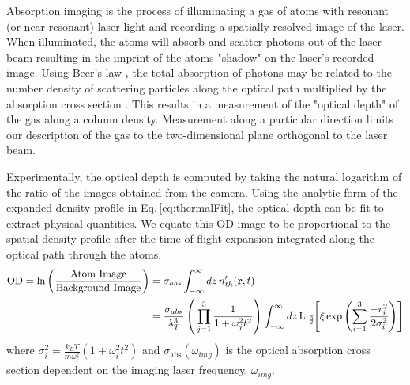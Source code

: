 Absorption imaging is the process of illuminating a gas of atoms with resonant (or near resonant) laser light and recording a spatially resolved image of the laser.
When illuminated, the atoms will absorb and scatter photons out of the laser beam resulting in the imprint of the atoms "shadow" on the laser's recorded image.
Using Beer's law \cite{Foot2005, Hueck2017, Reinaudi2007}, the total absorption of photons may be related to the number density of scattering particles along the optical path multiplied by the absorption cross section \cite{Mickelson2010b}. 
This results in a measurement of the "optical depth" of the gas along a column density. 
Measurement along a particular direction limits our description of the gas to the two-dimensional plane orthogonal to the laser beam.

Experimentally, the optical depth is computed by taking the natural logarithm of the ratio of the images obtained from the camera.
Using the analytic form of the expanded density profile in Eq.\,\ref{eq:thermalFit}, the optical depth can be fit to extract physical quantities.
We equate this OD image to be proportional to the spatial density profile after the time-of-flight expansion integrated along the optical path through the atoms.
\begin{equation} \label{eq:polyLogExp}
\begin{split}
	\text{OD} = \text{ln} \left( \frac{\text{Atom Image}}{\text{Background Image}} \right) &= \sigma_{abs} \int_{-\infty}^{\infty} dz \, n_{th}'(\mathbf{r},t) \\ 
&= \frac{\sigma_{abs}}{\lambda_T^3} \left( \, \prod_{j=1}^3 \frac{1}{1+\omega_j^2t^2}\right) \int_{-\infty}^{\infty} dz\,\text{Li}_{\scriptscriptstyle\frac{3}{2}\!}\!\left[ \xi \,\text{exp}\left( {\sum_{i=1}^3 \frac{-r_i^2}{2\sigma_i^2}} \right) \right]
\end{split}
\end{equation}
where $\sigma_i^2 = \frac{k_BT}{m\omega_i^2}(1+\omega_i^2t^2)$ and $\sigma_{\text{abs}}(\omega_{img})$ is the optical absorption cross section dependent on the imaging laser frequency, $\omega_{img}$.

